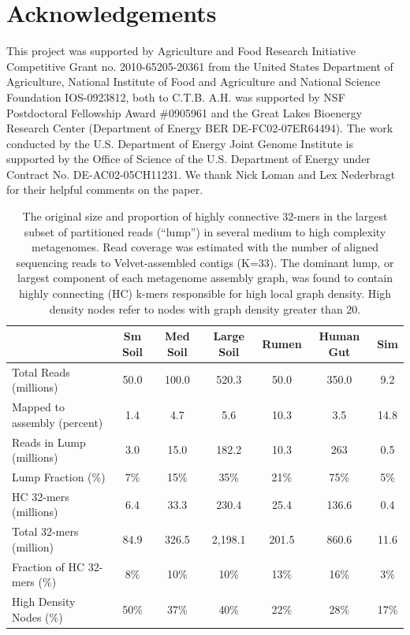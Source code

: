 \documentclass[10pt]{article}
\begin{document}
\section*{Acknowledgements}

This project was supported by Agriculture and Food Research Initiative
Competitive Grant no. 2010-65205-20361 from the United States
Department of Agriculture, National Institute of Food and Agriculture
and National Science Foundation IOS-0923812, both to C.T.B.  A.H. was
supported by NSF Postdoctoral Fellowship Award \#0905961 and the Great
Lakes Bioenergy Research Center (Department of Energy BER
DE-FC02-07ER64494).  The work conducted by the U.S. Department of
Energy Joint Genome Institute is supported by the Office of Science of
the U.S. Department of Energy under Contract No. DE-AC02-05CH11231.
We thank Nick Loman and Lex Nederbragt for their helpful comments on
the paper.




\pagebreak

\begin{table}[h]
\centering
\caption{The original size and proportion of highly connective 32-mers in the largest subset of partitioned reads (``lump'') in several medium to high complexity metagenomes.  Read coverage was estimated with the number of aligned sequencing reads to Velvet-assembled contigs (K=33).  The dominant lump, or largest component of each metagenome assembly graph, was found to contain highly connecting (HC) k-mers responsible for high local graph density.  High density nodes refer to nodes with graph density greater than 20.}
\begin{tabular}{l c c c c c c }
& Sm Soil & Med Soil & Large Soil & Rumen & Human Gut & Sim  \\
\hline
Total Reads (millions) & 50.0 & 100.0 & 520.3 & 50.0 & 350.0 & 9.2 \\
Mapped to assembly (percent) & 1.4 & 4.7 & 5.6 & 10.3 & 3.5 & 14.8 \\
Reads in Lump (millions) & 3.0  & 15.0 & 182.2 & 10.3  & 263  & 0.5  \\
Lump Fraction (\%) & 7\% & 15\% & 35\% & 21\% & 75\% & 5\%\\
HC 32-mers (millions) & 6.4 & 33.3 & 230.4 & 25.4 & 136.6 & 0.4\\
Total 32-mers (million) & 84.9 & 326.5 & 2,198.1 & 201.5 & 860.6 & 11.6\\
Fraction of HC 32-mers (\%) & 8\% & 10\% & 10\% & 13\% & 16\% & 3\% \\
High Density Nodes (\%) & 50\% & 37\% & 40\% & 22\% & 28\% & 17\% \\
\hline
\end{tabular}
\label{data-summary}
\end{table}
\end{document}
